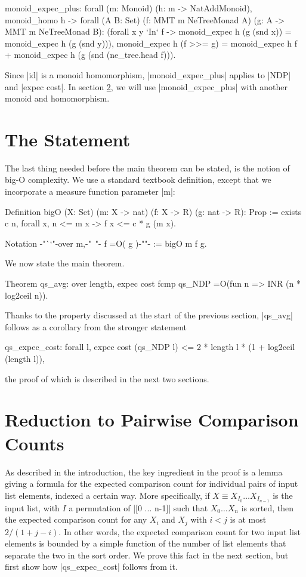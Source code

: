 \documentclass[runningheads]{llncs}
\begin{document}
\begin{code}
  monoid_expec_plus: forall (m: Monoid) (h: m -> NatAddMonoid),
    monoid_homo h -> forall (A B: Set)
    (f: MMT m NeTreeMonad A) (g: A -> MMT m NeTreeMonad B):
    (forall x y `In` f -> monoid_expec h (g (snd x)) = monoid_expec h (g (snd y))),
    monoid_expec h (f >>= g) =
      monoid_expec h f + monoid_expec h (g (snd (ne_tree.head f))).
\end{code}

Since |id| is a monoid homomorphism, |monoid_expec_plus| applies to |NDP| and |expec cost|. In section \ref{reduction}, we will use |monoid_expec_plus| with another monoid and homomorphism.

\section{The Statement}
\label{statement}

The last thing needed before the main theorem can be stated, is the notion of big-O complexity. We use a standard textbook definition, except that we incorporate a measure function parameter |m|:

\begin{code}
  Definition bigO (X: Set) (m: X -> nat) (f: X -> R) (g: nat -> R): Prop
      := exists c n, forall x, n <= m x -> f x <= c * g (m x).

  Notation {-"``"-}over m,{-"\ "-} f =O( g ){-""-} := bigO m f g.
\end{code}
We now state the main theorem.
\begin{code}
  Theorem qs_avg: over length, expec cost fcmp qs_NDP =O(fun n => INR (n * log2ceil n)).
\end{code}
Thanks to the property discussed at the start of the previous section, %
|qs_avg| follows as a corollary from the stronger statement
\begin{code}
  qs_expec_cost: forall l, expec cost (qs_NDP l) <= 2 * length l * (1 + log2ceil (length l)),
\end{code}
the proof of which is described in the next two sections.

\section{Reduction to Pairwise Comparison Counts}
\label{reduction}

As described in the introduction, the key ingredient in the proof is a lemma giving a formula for the expected comparison count for individual pairs of input list elements, indexed a certain way. More specifically, if $X \equiv X_{I_0} \ldots X_{I_{n-1}}$ is the input list, with $I$ a permutation of |[0 ... n-1]| such that $X_0 \ldots X_n$ is sorted, then the expected comparison count for any $X_i$ and $X_j$ with $i < j$ is at most $2 / (1 + j - i)$. In other words, the expected comparison count for two input list elements is bounded by a simple function of the number of list elements that separate the two in the sort order. We prove this fact in the next section, but first show how |qs_expec_cost| follows from it.
\end{document}
